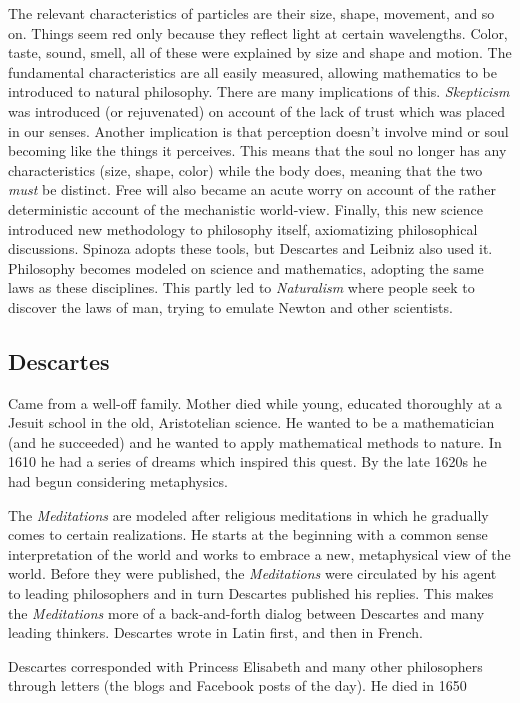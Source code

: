 The relevant characteristics of particles are their size, shape, movement, and so on. Things seem red only because they reflect light at certain wavelengths. Color, taste, sound, smell, all of these were explained by size and shape and motion. The fundamental characteristics are all easily measured, allowing mathematics to be introduced to natural philosophy. There are many implications of this. \emph{Skepticism} was introduced (or rejuvenated) on account of the lack of trust which was placed in our senses. Another implication is that perception doesn't involve mind or soul becoming like the things it perceives. This means that the soul no longer has any characteristics (size, shape, color) while the body does, meaning that the two \emph{must} be distinct. Free will also became an acute worry on account of the rather deterministic account of the mechanistic world-view. Finally, this new science introduced new methodology to philosophy itself, axiomatizing philosophical discussions. Spinoza adopts these tools, but Descartes and Leibniz also used it. Philosophy becomes modeled on science and mathematics, adopting the same laws as these disciplines. This partly led to \emph{Naturalism} where people seek to discover the laws of man, trying to emulate Newton and other scientists.

\subsection*{Descartes}

Came from a well-off family. Mother died while young, educated thoroughly at a Jesuit school in the old, Aristotelian science. He wanted to be a mathematician (and he succeeded) and he wanted to apply mathematical methods to nature. In 1610 he had a series of dreams which inspired this quest. By the late 1620s he had begun considering metaphysics.

The \emph{Meditations} are modeled after religious meditations in which he gradually comes to certain realizations. He starts at the beginning with a common sense interpretation of the world and works to embrace a new, metaphysical view of the world. Before they were published, the \emph{Meditations} were circulated by his agent to leading philosophers and in turn Descartes published his replies. This makes the \emph{Meditations} more of a back-and-forth dialog between Descartes and many leading thinkers. Descartes wrote in Latin first, and then in French.

Descartes corresponded with Princess Elisabeth and many other philosophers through letters (the blogs and Facebook posts of the day). He died in 1650 

